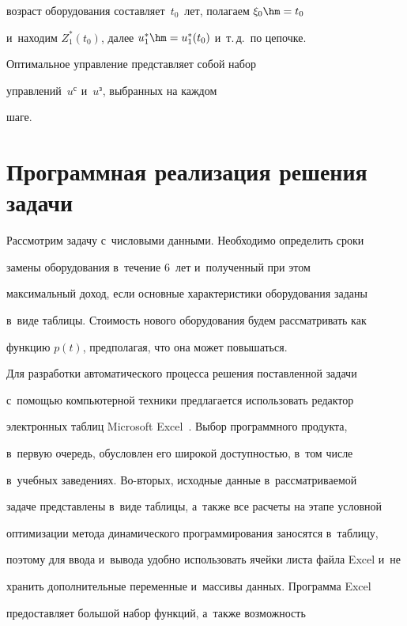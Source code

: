 возраст оборудования со\-став\-ля\-ет~$t_0$~лет, полагаем $\xi_0\hm = t_0$ 


и~находим $Z_1^*(t_0)$, далее $u_1^*\hm = u_1^*(t_0)$ и~т.\,д.\ по цепочке. 


Оптимальное управ\-ле\-ние пред\-став\-ля\-ет собой набор 


управлений~$u^{\mathrm{с}}$ и~$u^{\mathrm{з}}$, вы\-бран\-ных на каж\-дом 


шаге.


  


\section{Программная реализация решения задачи}





  Рассмотрим задачу с~числовыми данными. Необходимо определить сроки 


замены оборудования в~течение 6~лет и~полученный при этом 


максимальный доход, если основные характеристики оборудования заданы 


в~виде таблицы. Стоимость нового оборудования будем рассматривать как 


функцию $p(t)$, предполагая, что она может повышаться.


  


  Для разработки автоматического процесса решения поставленной задачи 


  с~помощью компьютерной техники предлагается использовать редактор 


электронных таб\-лиц Microsoft Excel~\cite{8-a}. Выбор программного продукта, 


в~первую очередь, обуслов\-лен его широкой до\-ступ\-ностью, в~том чис\-ле 


в~учебных заведениях. Во-вто\-рых, исходные данные в~рассматриваемой 


задаче представлены в~виде таб\-ли\-цы, а~так\-же все расчеты на этапе условной 


оптимизации метода динамического программирования заносятся в~таб\-ли\-цу, 


поэтому для ввода и~вывода удобно использовать ячейки листа файла Excel и~не 


хранить дополнительные переменные и~массивы данных. Программа Excel 


предоставляет большой набор функций, а~так\-же воз\-мож\-ность 


